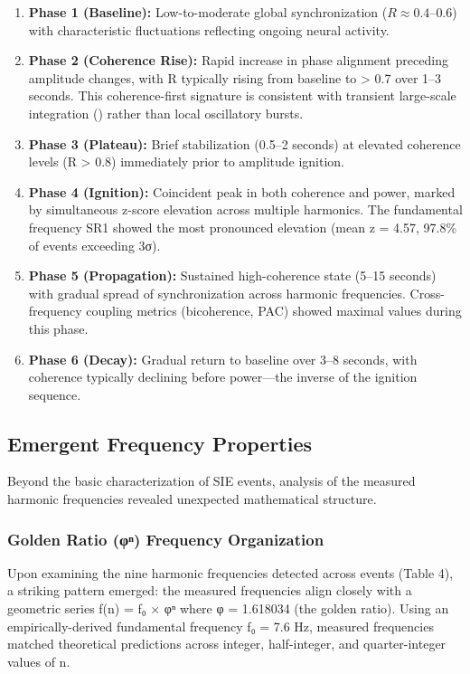 \documentclass[11pt,a4paper]{article}
\begin{document}
\begin{enumerate}
    \item \textbf{Phase 1 (Baseline):} Low-to-moderate global synchronization ($R \approx 0.4$--$0.6$) with characteristic fluctuations reflecting ongoing neural activity.
    \item \textbf{Phase 2 (Coherence Rise):} Rapid increase in phase alignment preceding amplitude changes, with R typically rising from baseline to > 0.7 over 1–3 seconds. This coherence-first signature is consistent with transient large-scale integration (\cite{varela2001brainweb}) rather than local oscillatory bursts.
    \item \textbf{Phase 3 (Plateau):} Brief stabilization (0.5–2 seconds) at elevated coherence levels (R > 0.8) immediately prior to amplitude ignition.
    \item \textbf{Phase 4 (Ignition):} Coincident peak in both coherence and power, marked by simultaneous z-score elevation across multiple harmonics. The fundamental frequency SR1 showed the most pronounced elevation (mean z = 4.57, 97.8\% of events exceeding 3σ).
    \item \textbf{Phase 5 (Propagation):} Sustained high-coherence state (5–15 seconds) with gradual spread of synchronization across harmonic frequencies. Cross-frequency coupling metrics (bicoherence, PAC) showed maximal values during this phase.
    \item \textbf{Phase 6 (Decay):} Gradual return to baseline over 3–8 seconds, with coherence typically declining before power—the inverse of the ignition sequence.
\end{enumerate}

\subsection{Emergent Frequency Properties}
Beyond the basic characterization of SIE events, analysis of the measured harmonic frequencies revealed unexpected mathematical structure.

\subsubsection{Golden Ratio (φⁿ) Frequency Organization}
Upon examining the nine harmonic frequencies detected across events (Table 4), a striking pattern emerged: the measured frequencies align closely with a geometric series f(n) = f₀ × φⁿ where φ = 1.618034 (the golden ratio). Using an empirically-derived fundamental frequency f₀ = 7.6 Hz, measured frequencies matched theoretical predictions across integer, half-integer, and quarter-integer values of n.
\end{document}
